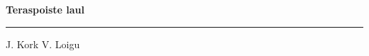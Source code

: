 \documentclass[10pt]{book}
\begin{document}
{
  \samepage
  \raggedbottom
  \raggedright
  \sloppy


  \vspace{0.2in}

  \noindent\begin{minipage}{.1\textwidth}
    \hfill\vspace{0.1in}
  \end{minipage}%
  \noindent\begin{minipage}{.8\textwidth}
    \centering
    \bfseries
    \large Teraspoiste laul
  \end{minipage}%
  \noindent\begin{minipage}{.1\textwidth}
      \hfill\vspace{0.1in}
  \end{minipage}

  \nopagebreak[4]
  \vspace{0.1in}
  \nopagebreak[4]
  \hrule height 0.05ex
  \nopagebreak[4]
  \vspace{-0.05in}

  {\footnotesize J. Kork \hfill V. Loigu }\\
  \vspace{0.01in}


  \vspace{0.01in}
  \nopagebreak[4]
  {%
\parindent 0pt
\noindent
\ifx\preLilyPondExample \undefined
\else
  \expandafter\preLilyPondExample
\fi
\def\lilypondbook{}%

\ifx\postLilyPondExample \undefined
\else
  \expandafter\postLilyPondExample
\fi
}

}
\end{document}
